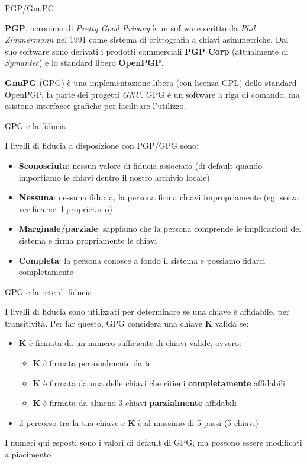 \documentclass[10pt]{beamer}
\begin{document}
\begin{frame}{PGP/GnuPG}

\textbf{PGP}, acronimo di \textit{Pretty Good Privacy} è un software scritto da \textit{Phil Zimmermann} nel 1991 come sistema di crittografia a chiavi asimmetriche. Dal suo software sono derivati i prodotti commerciali \textbf{PGP Corp} (attualmente di \textit{Symantec}) e lo standard libero \textbf{OpenPGP}.

\textbf{GnuPG} (GPG) è una implementazione libera (con licenza GPL) dello standard OpenPGP, fa parte dei progetti \textit{GNU}. GPG è un software a riga di comando, ma esistono interfacce grafiche per facilitare l'utilizzo.

\end{frame}

\begin{frame}{GPG e la fiducia}

I livelli di fiducia a disposizione con PGP/GPG sono:

\begin{itemize}
\item \textbf{Sconosciuta}: nessun valore di fiducia associato (di default quando importiamo le chiavi dentro il nostro archivio locale)
\item \textbf{Nessuna}: nessuna fiducia, la persona firma chiavi impropriamente (eg. senza verificarne il proprietario)
\item \textbf{Marginale/parziale}: sappiamo che la persona comprende le implicazioni del sistema e firma propriamente le chiavi
\item \textbf{Completa}: la persona conosce a fondo il sistema e possiamo fidarci completamente
\end{itemize}

\end{frame}

\begin{frame}{GPG e la rete di fiducia}

I livelli di fiducia sono utilizzati per determinare se una chiave è affidabile, per transitività. Per far questo, GPG considera una chiave \textbf{K} valida se:

\begin{itemize}
\item \textbf{K} è firmata da un numero sufficiente di chiavi valide, ovvero:
\begin{itemize}
\item \textbf{K} è firmata personalmente da te
\item \textbf{K} è firmata da una delle chiavi che ritieni \textbf{completamente} affidabili
\item \textbf{K} è firmata da almeno 3 chiavi \textbf{parzialmente} affidabili
\end{itemize}
\item il percorso tra la tua chiave e \textbf{K} è al massimo di 5 passi (5 chiavi)
\end{itemize}

I numeri qui esposti sono i valori di default di GPG, ma possono essere modificati a piacimento

\end{frame}
\end{document}
